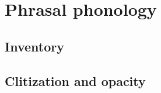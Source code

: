 \chapter{Phrasal phonology}

\section{Inventory}

\section{Clitization and opacity}

\citet{RyanInPress}
